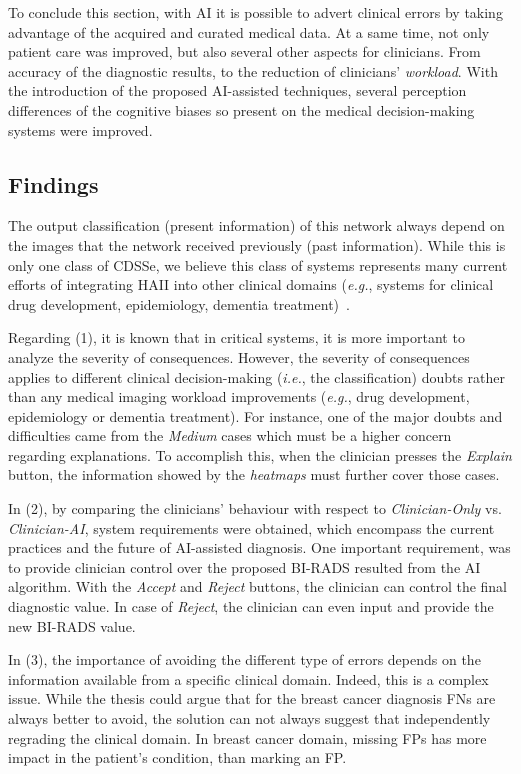 To conclude this section, with \ac{AI} it is possible to advert clinical errors by taking advantage of the acquired and curated medical data.
At a same time, not only patient care was improved, but also several other aspects for clinicians.
From accuracy of the diagnostic results, to the reduction of clinicians' {\it workload}.
With the introduction of the proposed \ac{AI}-assisted techniques, several perception differences of the cognitive biases so present on the medical decision-making systems were improved.

\subsection{Findings}
\label{sec:sec006007003}

The output classification (present information) of this network always depend on the images that the network received previously (past information).
While this is only one class of \ac{CDSSe}, we believe this class of systems represents many current efforts of integrating \ac{HAII} into other clinical domains ({\it e.g.}, systems for clinical drug development, epidemiology, dementia treatment)~\cite{Savage2019, shah2019artificial, topol2019high}.

Regarding (1), it is known that in critical systems, it is more important to analyze the severity of consequences.
However, the severity of consequences applies to different clinical decision-making ({\it i.e.}, the classification) doubts rather than any medical imaging workload improvements ({\it e.g.}, drug development, epidemiology or dementia treatment).
For instance, one of the major doubts and difficulties came from the {\it Medium} cases which must be a higher concern regarding explanations.
To accomplish this, when the clinician presses the {\it Explain} button, the information showed by the {\it heatmaps} must further cover those cases.

In (2), by comparing the clinicians' behaviour with respect to {\it Clinician-Only} vs. {\it Clinician-AI}, system requirements were obtained, which encompass the current practices and the future of \ac{AI}-assisted diagnosis.
One important requirement, was to provide clinician control over the proposed \ac{BI-RADS} resulted from the \ac{AI} algorithm.
With the {\it Accept} and {\it Reject} buttons, the clinician can control the final diagnostic value.
In case of {\it Reject}, the clinician can even input and provide the new \ac{BI-RADS} value.

In (3), the importance of avoiding the different type of errors depends on the information available from a specific clinical domain.
Indeed, this is a complex issue.
While the thesis could argue that for the breast cancer diagnosis \acp{FN} are always better to avoid, the solution can not always suggest that independently regrading the clinical domain.
In breast cancer domain, missing \acp{FP} has more impact in the patient's condition, than marking an \ac{FP}.  

